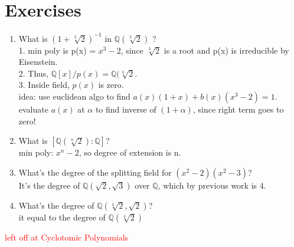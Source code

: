 \documentclass[12pt]{article}
\def\Q{\ensuremath{\mathbb{Q}}}
\newcommand{\gray}[1]{\textcolor[gray]{0.5}{#1}} %
\begin{document}
\section*{Exercises}
\begin{enumerate}
    \item What is $(1 + \sqrt[3]{2})^{-1}$ in $\Q(\sqrt[3]{2})$ ? \\
    \gray{1. min poly is p(x) = $x^3 - 2$, since $\sqrt[3]{2}$ is a root and p(x) is irreducible by Eisenstein. \\
    2. Thus, $\Q[x] / p(x) = \Q(\sqrt[3]{2}$. \\
    3. Inside field, $p(x)$ is zero.\\
    idea: use euclidean algo to find $a(x) (1+x) + b(x)(x^3-2) = 1$.\\
    evaluate $a(x)$ at $\alpha$ to find inverse of $(1+ \alpha)$, since right term goes to zero!}

    \item What is $[\Q(\sqrt[n]{2}) : \Q]$?\\
    \gray{min poly: $x^n-2$, so degree of extension is n.}

    \item What's the degree of the splitting field for $(x^2 -2)(x^2-3)$?\\
    \gray{It's the degree of $\Q(\sqrt{2}, \sqrt{3})$ over $\Q$, which by previous work is $4$.}

    \item What's the degree of $\Q(\sqrt[4]{2}, \sqrt{2})$? \\
    \gray{it equal to the degree of $\Q(\sqrt[4]{2})$}
\end{enumerate}
\textcolor{red}{left off at Cyclotomic Polynomials}
\end{document}
